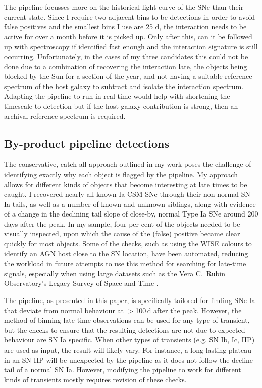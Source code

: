 \documentclass[a4paper,oneside,12pt, class=Latex/Classes/PhDthesisPSnPDF, crop=false]{standalone}
\begin{document}
The pipeline focusses more on the historical light curve of the SNe than their current state. Since I require two adjacent bins to be detections in order to avoid false positives and the smallest bins I use are 25 d, the interaction needs to be active for over a month before it is picked up. Only after this, can it be followed up with spectroscopy if identified fast enough and the interaction signature is still occurring. Unfortunately, in the cases of my three candidates this could not be done due to a combination of recovering the interaction late, the objects being blocked by the Sun for a section of the year, and not having a suitable reference spectrum of the host galaxy to subtract and isolate the interaction spectrum. Adapting the pipeline to run in real-time would help with shortening the timescale to detection but if the host galaxy contribution is strong, then an archival reference spectrum is required.

\subsection{By-product pipeline detections}
The conservative, catch-all approach outlined in my work poses the challenge of identifying exactly why each object is flagged by the pipeline. My approach allows for different kinds of objects that become interesting at late times to be caught. I recovered nearly all known Ia-CSM SNe through their non-normal SN Ia tails, as well as a number of known and unknown siblings, along with evidence of a change in the declining tail slope of close-by, normal Type Ia SNe around 200 days after the peak. In my sample, four per cent of the objects needed to be visually inspected, upon which the cause of the (false) positive became clear quickly for most objects. Some of the checks, such as using the WISE colours to identify an AGN host close to the SN location, have been automated, reducing the workload in future attempts to use this method for searching for late-time signals, especially when using large datasets such as the Vera C.~Rubin Observatory's Legacy Survey of Space and Time \cite[LSST;][]{LSST}.

The pipeline, as presented in this paper, is specifically tailored for finding SNe Ia that deviate from normal behaviour at $>$100\,d after the peak. However, the method of binning late-time observations can be used for any type of transient, but the checks to ensure that the resulting detections are not due to expected behaviour are SN Ia specific. When other types of transients (e.g. SN Ib, Ic, IIP) are used as input, the result will likely vary. For instance, a long lasting plateau in an SN IIP will be unexpected by the pipeline as it does not follow the decline tail of a normal SN Ia. However, modifying the pipeline to work for different kinds of transients mostly requires revision of these checks.
\end{document}
